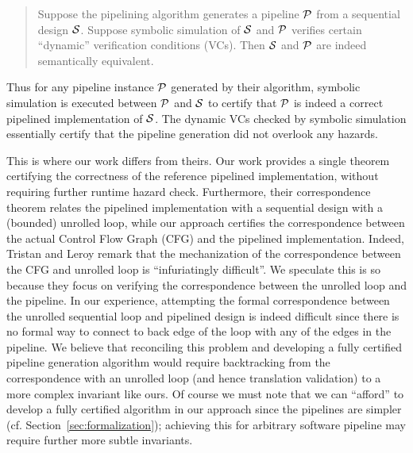 \begin{quote}
Suppose the pipelining algorithm generates a pipeline
${\cal{P}}$ from a sequential design ${\cal{S}}$.  Suppose
symbolic simulation of ${\cal{S}}$ and ${\cal{P}}$ verifies
certain ``dynamic'' verification conditions (VCs).  Then
${\cal{S}}$ and ${\cal{P}}$ are indeed semantically
equivalent.
\end{quote}

\noindent
Thus for any pipeline instance ${\cal{P}}$ generated by
their algorithm, symbolic simulation is executed between
${\cal{P}}$ and ${\cal{S}}$ to certify that ${\cal{P}}$ is
indeed a correct pipelined implementation of ${\cal{S}}$.
The dynamic VCs checked by symbolic simulation essentially
certify that the pipeline generation did not overlook any
hazards.

This is where our work differs from theirs.  Our work provides 
a single theorem certifying the
correctness of the reference pipelined implementation,
without requiring further runtime hazard check.
Furthermore, their correspondence theorem relates the
pipelined implementation with a sequential design with a
(bounded) unrolled loop, while our approach certifies the
correspondence between the actual Control Flow Graph (CFG)
and the pipelined implementation.  Indeed, Tristan and Leroy
remark that the mechanization of the correspondence between
the CFG and unrolled loop is ``infuriatingly difficult''.
We speculate this is so because they focus on verifying the
correspondence between the unrolled loop and the pipeline.
In our experience, attempting the formal correspondence between the unrolled
sequential loop and pipelined design is indeed difficult since
there is no formal way to connect to back edge of the loop
with any of the edges in the pipeline.  We believe that
reconciling this problem and developing a fully certified
pipeline generation algorithm would require backtracking
from the correspondence with an unrolled loop (and hence
translation validation) to a more complex invariant like
ours.  Of course we must note that we can ``afford'' to
develop a fully certified algorithm in our approach since
the pipelines are simpler
(cf. Section~\ref{sec:formalization}); achieving this for
arbitrary software pipeline may require further more subtle
invariants.

